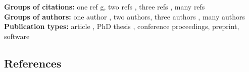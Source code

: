 \documentclass[a4paper]{article}
\begin{document}
\textbf{Groups of citations:} one ref \cite{karelPhD}g, two refs \cite{karelPhD,simplitigs},
  three refs \cite{karelPhD,gnt,simplitigs}, many refs \\
\textbf{Groups of authors:} one author \cite{karelPhD}, two authors, three
  authors \cite{simplitigs}, many authors \cite{gnt} \\
\textbf{Publication types:} article \cite{gnt}, PhD thesis \cite{karelPhD},
  conference proceedings, preprint, software


\subsection{References}

\printbibliography
\end{document}

